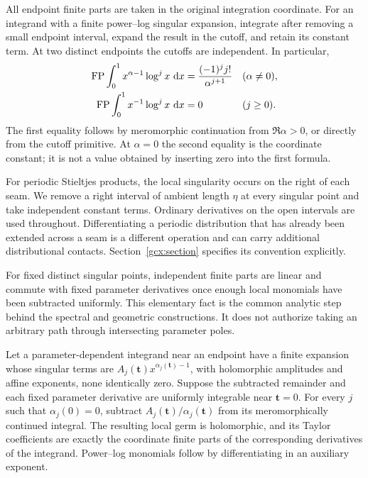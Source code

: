 All endpoint finite parts are taken in the original integration
coordinate. For an integrand with a finite power--log singular expansion,
integrate after removing a small endpoint interval, expand the result
in the cutoff, and retain its constant term. At two distinct endpoints
the cutoffs are independent. In particular,
\begin{align}
 \operatorname{FP}\int_0^1 x^{\alpha-1}\log^j x\,\,\mathrm d x
   &=\frac{(-1)^j j!}{\alpha^{j+1}}
                    &&(\alpha\ne0),\label{scope:monomial}\\
 \operatorname{FP}\int_0^1 x^{-1}\log^j x\,\,\mathrm d x&=0
                    &&(j\ge0).\label{scope:resonantmonomial}
\end{align}
The first equality follows by meromorphic continuation from
$\Re\alpha>0$, or directly from the cutoff primitive.
At $\alpha=0$ the second equality is the coordinate constant;
it is not a value obtained by inserting zero into the first formula.

For periodic Stieltjes products, the local singularity occurs on the
right of each seam. We remove a right interval of ambient length
$\eta$ at every singular point and take independent constant terms.
Ordinary derivatives on the open intervals are used throughout.
Differentiating a periodic distribution that has already been extended
across a seam is a different operation and can carry additional
distributional contacts. Section~\ref{gcx:section} specifies its
convention explicitly.

For fixed distinct singular points, independent finite parts are linear
and commute with fixed parameter derivatives once enough local
monomials have been subtracted uniformly. This elementary fact is the
common analytic step behind the spectral and geometric constructions.
It does not authorize taking an arbitrary path through intersecting
parameter poles.

\begin{lemma}\label{scope:completionlemma}
Let a parameter-dependent integrand near an endpoint have a finite
expansion whose singular terms are
$A_j(\mathbf t)x^{\alpha_j(\mathbf t)-1}$, with holomorphic amplitudes
and affine exponents, none identically zero. Suppose the subtracted remainder and each fixed
parameter derivative are uniformly integrable near $\mathbf t=0$.
For every $j$ such that $\alpha_j(0)=0$, subtract
$A_j(\mathbf t)/\alpha_j(\mathbf t)$ from its meromorphically continued
integral. The resulting local germ is holomorphic, and its Taylor
coefficients are exactly the coordinate finite parts of the
corresponding derivatives of the integrand. Power--log monomials follow
by differentiating in an auxiliary exponent.
\end{lemma}


